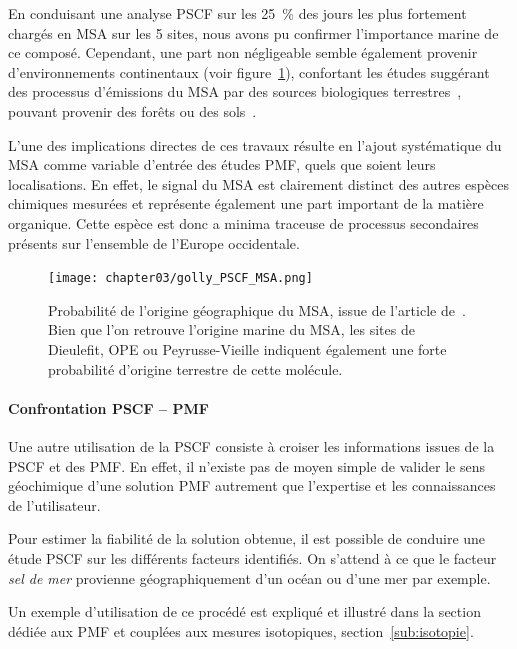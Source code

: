 En conduisant une analyse PSCF sur les \SI{25}{\percent} des jours les plus fortement chargés en MSA
sur les 5 sites, nous avons pu confirmer l'importance marine de ce composé. 
Cependant, une part non négligeable semble également provenir d'environnements
continentaux (voir
figure~\ref{fig:chapter03/golly_PSCF_MSA}), confortant les études suggérant des processus
d'émissions du MSA par des sources biologiques terrestres~\autocite{bozzettiArgon2017},
pouvant provenir des forêts ou des
sols~\autocite{jardineDimethyl2015,miyazakiSeasonal2012}.

L'une des implications directes de ces travaux résulte en l'ajout systématique du MSA
comme variable d'entrée des études PMF, quels que soient leurs localisations. En effet, le
signal du MSA est clairement distinct des autres espèces chimiques mesurées et représente
également une part important de la matière organique. Cette espèce est donc a minima
traceuse de processus secondaires présents sur l'ensemble de l'Europe occidentale.

\begin{figure}[ht!]
    \centering
    \texttt{[image: chapter03/golly\_PSCF\_MSA.png]}
    \caption{Probabilité de l'origine géographique du MSA, issue de l'article
        de~\textcite{gollyOrganic2019}. Bien que l'on retrouve l'origine marine du MSA,
        les sites de Dieulefit, OPE ou Peyrusse-Vieille indiquent également une forte
        probabilité d'origine terrestre de cette molécule.}%
    \label{fig:chapter03/golly_PSCF_MSA}
\end{figure}

\paragraph{Confrontation PSCF -- PMF}%
\label{par:confrontation_pscf_pmf}

Une autre utilisation de la PSCF consiste à croiser les informations issues de la PSCF et
des PMF.
En effet, il n'existe pas de moyen simple de valider le sens géochimique d'une solution
PMF autrement que l'expertise et les connaissances de l'utilisateur.

Pour estimer la fiabilité de la solution obtenue, il est possible de conduire une
étude PSCF sur les différents facteurs identifiés. On s'attend à ce que le
facteur \textit{sel de mer} provienne géographiquement d'un océan ou d'une mer par
exemple.

Un exemple d'utilisation de ce procédé est expliqué et illustré dans la section dédiée aux
PMF et couplées aux mesures isotopiques, section~\ref{sub:isotopie}.



